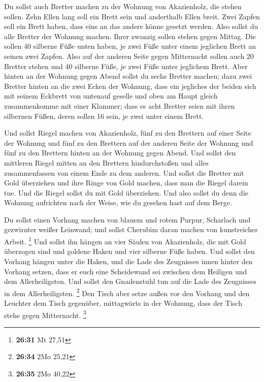  Du sollst auch Bretter machen zu der Wohnung von
Akazienholz, die stehen sollen.  Zehn Ellen lang soll ein
Brett sein und anderthalb Ellen breit.  Zwei Zapfen soll
ein Brett haben, dass eins an das andere könne gesetzt werden. Also
sollst du alle Bretter der Wohnung machen.  Ihrer zwanzig
sollen stehen gegen Mittag.  Die sollen 40 silberne Füße
unten haben, je zwei Füße unter einem jeglichen Brett an seinen zwei
Zapfen.  Also auf der anderen Seite gegen Mitternacht
sollen auch 20 Bretter stehen  und 40 silberne Füße, je
zwei Füße unter jeglichem Brett.  Aber hinten an der
Wohnung gegen Abend sollst du sechs Bretter machen;  dazu
zwei Bretter hinten an die zwei Ecken der Wohnung,  dass
ein jegliches der beiden sich mit seinem Eckbrett von untenauf geselle
und oben am Haupt gleich zusammenkomme mit einer Klammer; 
dass es acht Bretter seien mit ihren silbernen Füßen, deren sollen 16
sein, je zwei unter einem Brett.

 Und sollst Riegel machen von Akazienholz, fünf zu den
Brettern auf einer Seite der Wohnung  und fünf zu den
Brettern auf der anderen Seite der Wohnung und fünf zu den Brettern
hinten an der Wohnung gegen Abend.  Und sollst den
mittleren Riegel mitten an den Brettern hindurchstoßen und alles
zusammenfassen von einem Ende zu dem anderen.  Und sollst
die Bretter mit Gold überziehen und ihre Ringe von Gold machen, dass man
die Riegel darein tue.  Und die Riegel sollst du mit Gold
überziehen. Und also sollst du denn die Wohnung aufrichten nach der
Weise, wie du gesehen hast auf dem Berge.

 Du sollst einen Vorhang machen von blauem und rotem
Purpur, Scharlach und gezwirnter weißer Leinwand; und sollst Cherubim
daran machen von kunstreicher Arbeit. \footnote{\textbf{26:31} Mt 27,51}
 Und sollst ihn hängen an vier Säulen von Akazienholz, die
mit Gold überzogen sind und goldene Haken und vier silberne Füße haben.
 Und sollst den Vorhang hängen unter die Haken, und die
Lade des Zeugnisses innen hinter den Vorhang setzen, dass er euch eine
Scheidewand sei zwischen dem Heiligen und dem Allerheiligsten.
 Und sollst den Gnadenstuhl tun auf die Lade des Zeugnisses
in dem Allerheiligsten. \footnote{\textbf{26:34} 2Mo 25,21}
 Den Tisch aber setze außen vor den Vorhang und den
Leuchter dem Tisch gegenüber, mittagwärts in der Wohnung, dass der Tisch
stehe gegen Mitternacht. \footnote{\textbf{26:35} 2Mo 40,22}

